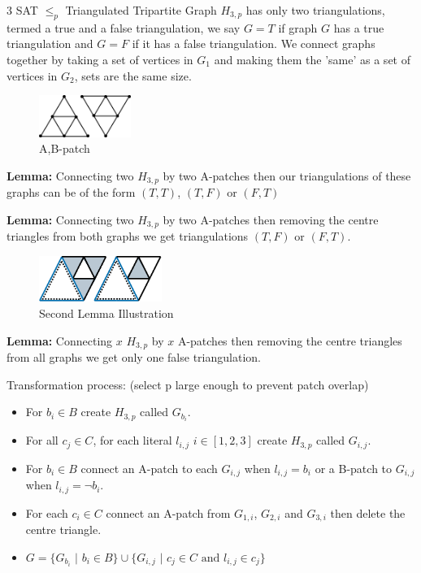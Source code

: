 \documentclass[final]{beamer}
\newlength{\colwidth}
\newcounter{col}
\begin{document}
\begin{frame}[t]
\begin{columns}[t]
\begin{column}{\colwidth}
\begin{block}{3 SAT $\leq_p$ Triangulated Tripartite Graph \cite{doi:10.1137/0210054}}
$H_{3,p}$ has only two triangulations, termed a true and a false triangulation, we say $G=T$ if graph $G$ has a true triangulation and $G=F$ if it has a false triangulation. We connect graphs together by taking a set of vertices in $G_1$ and making them the 'same' as a set of vertices in $G_2$, sets are the same size.

\begin{figure}
		\includegraphics[width=30mm]{patches.png}
		\caption{A,B-patch}
		\vspace{-60pt}
\end{figure}


\textbf{Lemma:} Connecting two $H_{3,p}$ by two A-patches then our triangulations of these graphs can be of the form $(T,T)$, $(T,F)$ or $(F,T)$

\textbf{Lemma:} Connecting two $H_{3,p}$ by two A-patches then removing the centre triangles from both graphs we get triangulations $(T,F)$ or $(F,T)$.

\begin{figure}
		\includegraphics[width=40mm]{lemma.png}
		\caption{Second Lemma Illustration}
		\vspace{-80pt}
\end{figure}

\textbf{Lemma:} Connecting $x$ $H_{3,p}$ by $x$ A-patches then removing the centre triangles from all graphs we get only one false triangulation.


Transformation process: (select p large enough to prevent patch overlap)
\begin{itemize}
\item For $b_i\in B$ create $H_{3,p}$ called $G_{b_i}$.
\item For all $c_j\in C$, for each literal $l_{i,j}$ $i\in [1,2,3]$ create $H_{3,p}$ called $G_{i,j}$.
\item For $b_i \in B$ connect an A-patch to each $G_{i,j}$ when $l_{i,j}=b_i$ or a B-patch to $G_{i,j}$ when $l_{i,j}=\neg b_i$. 
\item For each $c_i\in C$ connect an A-patch from $G_{1,i}$, $G_{2,i}$ and $G_{3,i}$ then delete the centre triangle. 
\item $G = \{G_{b_i}$ $|$ $b_i \in B\}\cup\{G_{i,j}$ $|$ $ c_j\in C\text{ and }l_{i,j}\in c_j \}$
\end{itemize}


\end{block}
\end{column}
\end{columns}
\end{frame}
\end{document}
